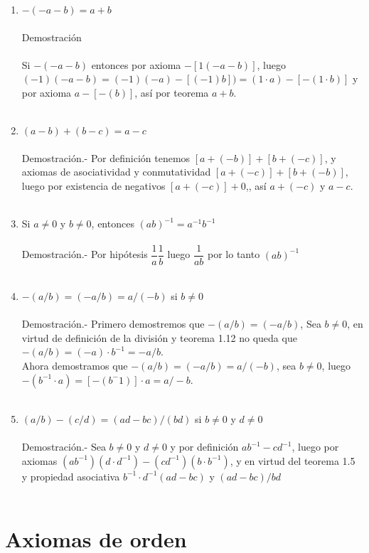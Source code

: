 \begin{enumerate}
\item $-(-a-b)=a+b$\\\\
Demostración\\\\
Si $-(-a-b)$ entonces por axioma $-\left[1(-a-b)\right]$, luego $(-1)(-a-b)=(-1)(-a)-\left[(-1)b\right])= (1\cdot a)-\left[-(1\cdot b)\right]$ y por axioma $a - \left[ - (b)\right]$, así por teorema $a+b$.\\\\

\item $(a-b)+(b-c)=a-c$\\\\
Demostración.- \;
Por definición tenemos $\left[ a+(-b) \right]+\left[ b+(-c) \right]$, y axiomas de asociatividad y conmutatividad $\left[ a+(-c) \right]+\left[ b+(-b) \right]$, luego por existencia de negativos  $\left[ a+(-c) \right] + 0$,, así $a+(-c)$ y $a-c$. \\\\

\item Si $a\neq 0$ y $b\neq 0$, entonces $(ab)^{-1} = a^{-1} b^{-1}$\\\\
Demostración.- \; Por hipótesis $\dfrac{1}{a} \dfrac{1}{b}$ luego $\dfrac{1}{ab}$ por lo tanto $(ab)^{-1}$\\\\

\item $-(a/b)=(-a/b)=a/(-b)$ si $b\neq 0$\\\\
Demostración.- \;
Primero demostremos que $-(a/b)=(-a/b)$, Sea $b\neq 0$, en virtud de definición de la división y teorema 1.12 no queda que $-(a/b)=(-a)\cdot b^{-1}=-a/b$.\\
Ahora demostramos que $-(a/b)=(-a/b)=a/(-b)$, sea $b\neq0$, luego $-(b^{-1}\cdot a)=\left[-(b^-1)\right]\cdot a = a/-b$. \\\\

\item $(a/b)-(c/d)=(ad-bc)/(bd)$ si $b\neq 0$ y $d\neq 0$\\\\
Demostración.- \;
Sea $b\neq 0$ y $d\neq 0$ y por definición $ab^{-1}-cd^{-1}$, luego por axiomas $(ab^{-1})(d\cdot d^{-1})-(cd^{-1})(b\cdot b^{-1})$, y en virtud del teorema 1.5 y propiedad asociativa $b^{-1}\cdot d^{-1}(ad-bc)$ y $(ad-bc)/bd$\\\\
\end{enumerate}

\section*{Axiomas de orden}
